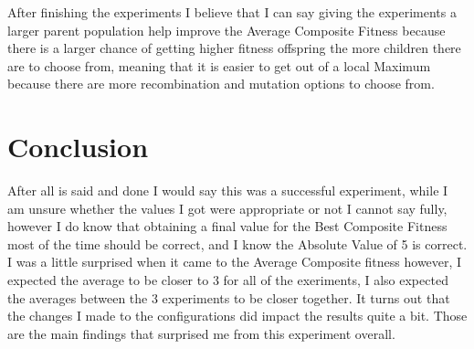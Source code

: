 \documentclass[•]{article}
\begin{document}
After finishing the experiments I believe that I can say giving the experiments a larger parent population help improve the Average Composite Fitness because there is a larger chance of getting higher fitness offspring the more children there are to choose from, meaning that it is easier to get out of a local Maximum because there are more recombination and mutation options to choose from.

\section{Conclusion}
\indent \indent After all is said and done I would say this was a successful experiment, while I am unsure whether the values I got were appropriate or not I cannot say fully, however I do know that obtaining a final value for the Best Composite Fitness most of the time should be correct, and I know the Absolute Value of 5 is correct.  I was a little surprised when it came to the Average Composite fitness however, I expected the average to be closer to 3 for all of the exeriments, I also expected the averages between the 3 experiments to be closer together.  It turns out that the changes I made to the configurations did impact the results quite a bit.  Those are the main findings that surprised me from this experiment overall.
\end{document}
